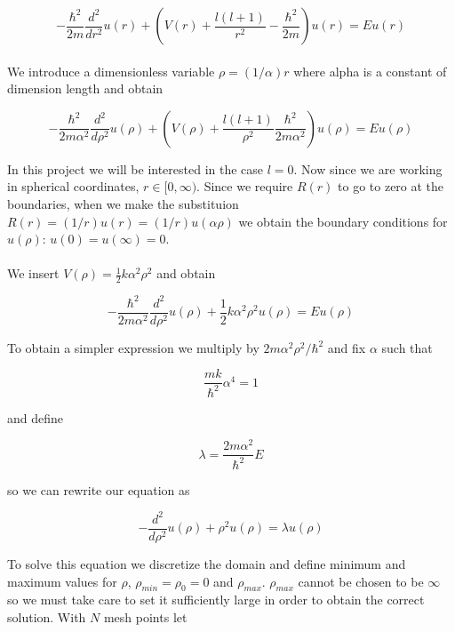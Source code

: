 \documentclass[%
 reprint,
 nobalancelastpage,
 amsmath,amssymb,
 aps,
]{revtex4-1}
\newcommand{\hbarm}{-\frac{\hbar^{2}}{2m}}
\newcommand{\ddrsq}{\frac{d^{2}}{dr^{2}}}
\newcommand{\ddrhosq}{\frac{d^{2}}{d\rho^{2}}}
\newcommand{\onehalf}{\frac{1}{2}}
\begin{document}
\begin{equation}
	\hbarm \ddrsq u(r) + (V(r) + \frac{l(l+1)}{r^{2}}\hbarm)u(r) = Eu(r)
\end{equation}
\\
We introduce a dimensionless variable $\rho = (1/ \alpha)r$ where alpha is a constant of dimension length and obtain

\begin{equation}
	-\frac{\hbar^{2}}{2m\alpha^{2}} \ddrhosq u(\rho) + (V(\rho) + \frac{l(l+1)}{\rho^{2}}\frac{\hbar^{2}}{2m\alpha^{2}})u(\rho) = E u(\rho)
\end{equation}

In this project we will be interested in the case $l = 0$. Now since we are working in spherical coordinates, $r \in [0, \infty)$. Since we require $R(r)$ to go to zero at the boundaries, when we make the substituion $R(r) = (1/r)u(r) = (1/r)u(\alpha \rho)$ we obtain the boundary conditions for $u(\rho)$: $u(0) = u(\infty) = 0$.
\\ \\
We insert $V(\rho) = \onehalf k\alpha^{2}\rho^{2}$ and obtain

\begin{equation}
	-\frac{\hbar^{2}}{2m\alpha^{2}} \ddrhosq u(\rho) + \onehalf k\alpha^{2} \rho^{2}u(\rho) = E u(\rho)
\end{equation}

To obtain a simpler expression we multiply by $2m\alpha^{2} \rho^{2} /\hbar^{2}$ and fix $\alpha$ such that

\begin{equation}
	\frac{mk}{\hbar^{2}}\alpha^{4} = 1
\end{equation}

and define

\begin{equation}
	\lambda = \frac{2m\alpha^{2}}{\hbar^{2}}E
\end{equation}

so we can rewrite our equation as

\begin{equation}
	-\ddrhosq u(\rho) + \rho^{2} u(\rho) = \lambda u({\rho})
\end{equation}

To solve this equation we discretize the domain and define minimum and maximum values for $\rho$, $\rho_{min} = \rho_{0} = 0$ and $\rho_{max}$. $\rho_{max}$ cannot be chosen to be $\infty$ so we must take care to set it sufficiently large in order to obtain the correct solution. With $N$ mesh points let
\end{document}
